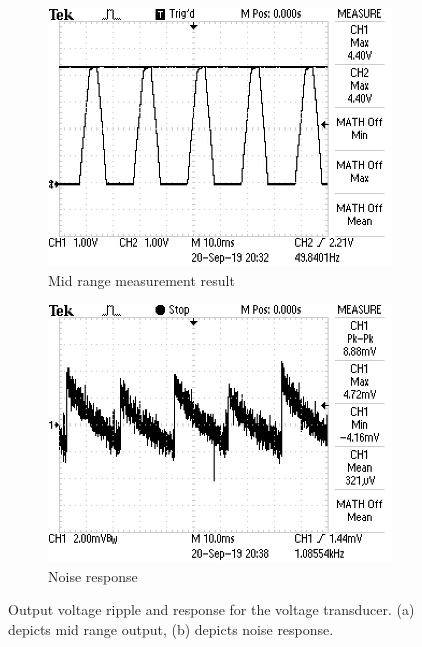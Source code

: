 \begin{figure}[h!]
 \centering
     \begin{subfigure}[]{0.45\textwidth}
        \centering
         \includegraphics[width=1\linewidth]{./Figures/voltagetransducermidrange.JPG}
		    \caption{Mid range measurement result} \label{subfig:voltagetransducermidrange}
     \end{subfigure}
      \begin{subfigure}[]{0.45\textwidth}
              \centering
  		\includegraphics[width=1\linewidth]{./Figures/voltagetransducernoise.JPG}
		    \caption{Noise response} \label{subfig:16VACinputchange}
     \end{subfigure}
   \caption[Measured results for the voltage transducer]{Output voltage ripple and response for the voltage transducer. (a) depicts mid range output, (b) depicts noise response. }
    \label{fig:simulation_results_box}
 \end{figure}
